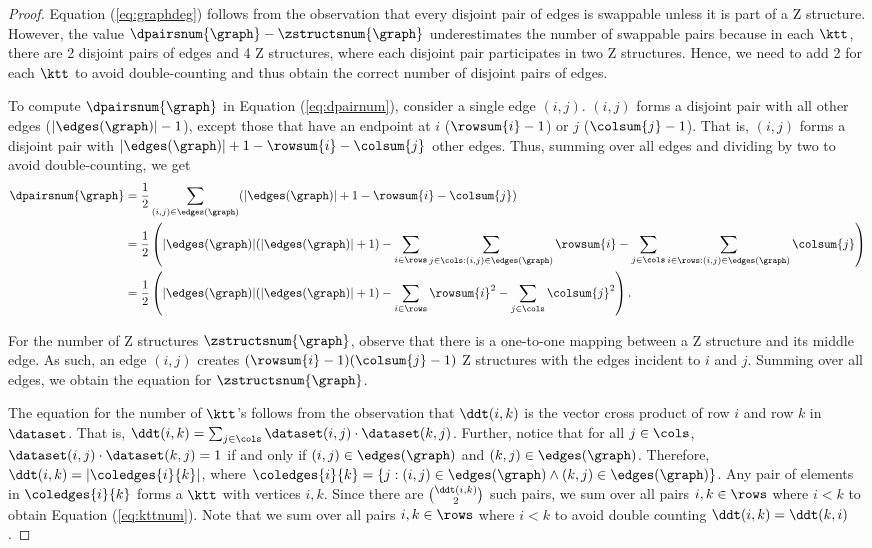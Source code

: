 \begin{proof}
	Equation (\ref{eq:graphdeg}) follows from the observation that every disjoint
	pair of edges is swappable unless it is part of a Z structure. However, the
	value $\dpairsnum{\graph} - \zstructsnum{\graph}$ underestimates the number of
	swappable pairs because in each $\ktt$, there are 2 disjoint pairs of edges
	and 4 Z structures, where each disjoint pair participates in two Z
	structures. Hence, we need to add 2 for each $\ktt$ to avoid double-counting
	and thus obtain the correct number of disjoint pairs of edges.

	To compute $\dpairsnum{\graph}$ in Equation (\ref{eq:dpairnum}), consider a
	single edge $(i, j)$. $(i, j)$ forms a disjoint pair with all other edges
	($|\edges(\graph)| - 1$), except those that have an endpoint at $i$
	($\rowsum{i} - 1$) or $j$ ($\colsum{j} - 1$). That is, $(i, j)$ forms a
	disjoint pair with $|\edges(\graph)| + 1 - \rowsum{i} - \colsum{j}$ other
	edges. Thus, summing over all edges and dividing by two to avoid
	double-counting, we get
	\begin{align*}
		\dpairsnum{\graph} &= \frac{1}{2} \sum_{(i, j) \in \edges(\graph)}
											(|\edges(\graph)| + 1 - \rowsum{i} - \colsum{j}) \\
											&= \frac{1}{2} \left(|\edges(\graph)| (|\edges(\graph)| +
											1) - \sum_{i \in \rows} \sum_{j \in \cols : (i, j) \in
											\edges(\graph)} \rowsum{i} - \sum_{j \in \cols} \sum_{i
											\in \rows : (i, j) \in \edges(\graph)} \colsum{j}\right)
											\\
											&= \frac{1}{2} \left(|\edges(\graph)| (|\edges(\graph)| +
											1) - \sum_{i \in \rows} {\rowsum{i}}^2  - \sum_{j \in
											\cols} {\colsum{j}}^2\right).
	\end{align*}

	For the number of Z structures $\zstructsnum{\graph}$, observe that there is a
	one-to-one mapping between a Z structure and its middle edge. As such, an
	edge $(i, j)$ creates $(\rowsum{i} - 1)(\colsum{j} - 1)$ Z structures with
	the edges incident to $i$ and $j$.  Summing over all edges, we obtain the
	equation for $\zstructsnum{\graph}$.

	The equation for the number of $\ktt$'s follows from the observation that
	$\ddt(i, k)$ is the vector cross product of row $i$ and row $k$ in
	$\dataset$. That is, $\ddt(i, k) = \sum_{j \in \cols} \dataset(i, j) \cdot
	\dataset(k, j)$. Further, notice that for all $j \in \cols$, $\dataset(i, j)
	\cdot \dataset(k, j) = 1$ if and only if $(i, j) \in \edges(\graph)$ and $(k,
	j) \in \edges(\graph)$. Therefore, $\ddt(i, k) = |\coledges{i}{k}|$, where
	$\coledges{i}{k} = \{j : (i, j) \in \edges(\graph) \wedge (k, j) \in
	\edges(\graph)\}$. Any pair of elements in  $\coledges{i}{k}$ forms a $\ktt$
	with vertices $i, k$. Since there are $\binom{\ddt(i, k)}{2}$ such pairs, we
	sum over all pairs $i, k \in \rows$ where $i < k$ to obtain Equation
	(\ref{eq:kttnum}). Note that we sum over all pairs $i, k \in \rows$ where $i
	< k$ to avoid double counting $\ddt(i, k) = \ddt(k, i)$.
\end{proof}

